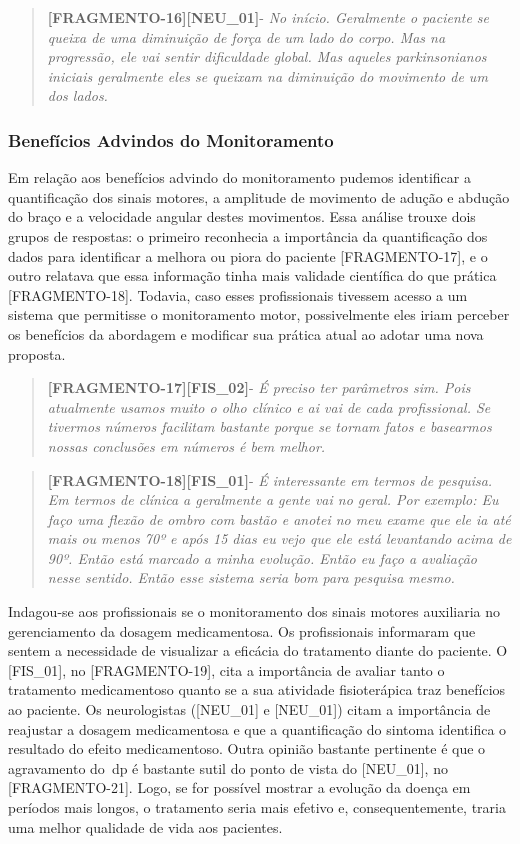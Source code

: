 \begin{quote}
\textbf{[FRAGMENTO-16][NEU\_01]}-
\emph{
No início. Geralmente o paciente se queixa de uma diminuição de força de um lado do corpo. Mas na progressão, ele vai sentir dificuldade global. Mas aqueles parkinsonianos iniciais geralmente eles se queixam na diminuição do movimento de um dos lados.
}
\end{quote}

\subsubsection{Benefícios Advindos do Monitoramento}


Em relação aos benefícios advindo do monitoramento pudemos identificar a quantificação dos sinais motores, a amplitude de movimento de adução e abdução do braço e a velocidade angular destes movimentos. Essa análise trouxe dois grupos de respostas: o primeiro reconhecia a importância da quantificação dos dados para identificar a melhora ou piora do paciente [FRAGMENTO-17], e o outro relatava que essa informação tinha mais validade científica do que prática [FRAGMENTO-18]. Todavia, caso esses profissionais tivessem acesso a um sistema que permitisse o monitoramento motor, possivelmente eles iriam perceber os benefícios da abordagem e modificar sua prática atual ao adotar uma nova proposta.

\begin{quote}
\textbf{[FRAGMENTO-17][FIS\_02]}-
\emph{
É preciso ter parâmetros sim. Pois atualmente usamos muito o olho clínico e ai vai de cada profissional. Se tivermos números facilitam bastante porque se tornam fatos e basearmos nossas conclusões em números é bem melhor.
}
\end{quote}

\begin{quote}
\textbf{[FRAGMENTO-18][FIS\_01]}-
\emph{
É interessante em termos de pesquisa. Em termos de clínica a geralmente a gente vai no geral. Por exemplo: Eu faço uma flexão de ombro com bastão e anotei no meu exame que ele ia até mais ou menos 70º e após 15 dias eu vejo que ele está levantando acima de 90º. Então está marcado a minha evolução. Então eu faço a avaliação nesse sentido. Então esse sistema seria bom para pesquisa mesmo.
}
\end{quote}


Indagou-se aos profissionais se o monitoramento dos sinais motores auxiliaria no gerenciamento da dosagem medicamentosa. Os profissionais informaram que sentem a necessidade de visualizar a eficácia do tratamento diante do paciente. O [FIS\_01], no [FRAGMENTO-19], cita a importância de avaliar tanto o tratamento medicamentoso quanto se a sua atividade fisioterápica traz benefícios ao paciente. Os neurologistas ([NEU\_01] e [NEU\_01]) citam a importância de reajustar a dosagem medicamentosa e que a quantificação do sintoma identifica o resultado do efeito medicamentoso. Outra opinião bastante pertinente é que o agravamento do~\ac{dp} é bastante sutil do ponto de vista do [NEU\_01], no [FRAGMENTO-21]. Logo, se for possível mostrar a evolução da doença em períodos mais longos, o tratamento seria mais efetivo e, consequentemente, traria uma melhor qualidade de vida aos pacientes.

